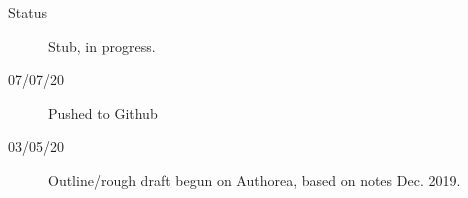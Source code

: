 \begin{description}
\item [{Status}] Stub, in progress.
\item [{07/07/20}] Pushed to Github
\item [{03/05/20}] Outline/rough draft begun on Authorea, based on notes Dec. 2019.
\end{description}